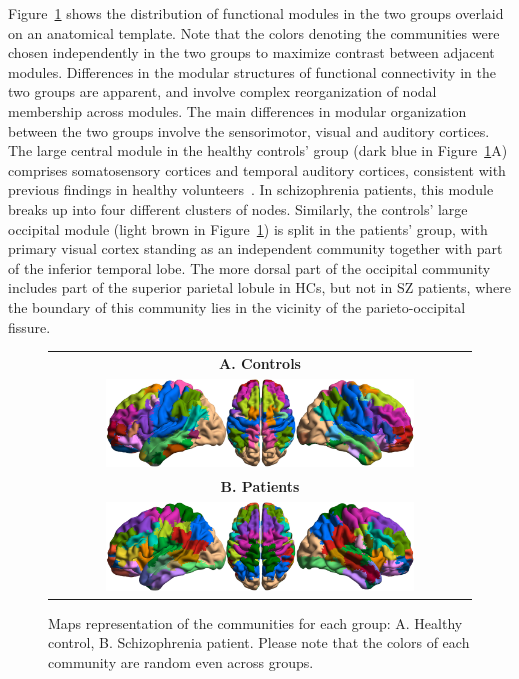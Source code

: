 Figure~\ref{fig:schizo_figure5} shows the distribution of functional modules in the two groups overlaid on an anatomical template.
Note that the colors denoting the communities were chosen independently in the two groups to maximize contrast between adjacent modules.
Differences in the modular structures of functional connectivity in the two groups are apparent, and involve complex reorganization of nodal membership across modules.
The main differences in modular organization between the two groups involve the sensorimotor, visual and auditory cortices.
The large central module in the healthy controls' group (dark blue in Figure~\ref{fig:schizo_figure5}A) comprises somatosensory cortices and temporal auditory cortices, consistent with previous findings in healthy volunteers~\cite{javitt2015}.
In schizophrenia patients, this module breaks up into four different clusters of nodes.
Similarly, the controls' large occipital module (light brown in Figure~\ref{fig:schizo_figure5}) is split in the patients' group, with primary visual cortex standing as an independent community together with part of the inferior temporal lobe.
The more dorsal part of the occipital community includes part of the superior parietal lobule in HCs, but not in SZ patients, where the boundary of this community lies in the vicinity of the parieto-occipital fissure.

\begin{figure}
\centering
    \begin{tabular}{c}
    \textbf{\textsf{A. Controls}} \\
	\includegraphics[width=0.75\textwidth]{images/schizo/schizo_fig_5a.jpg} \\
	\textbf{\textsf{B. Patients}} \\
	\includegraphics[width=0.75\textwidth]{images/schizo/schizo_fig_5b.jpg} \\
	\end{tabular}
\caption{Maps representation of the communities for each group: A. Healthy control, B. Schizophrenia patient. Please note that the colors of each community are random even across groups.}
\label{fig:schizo_figure5}
\end{figure}

